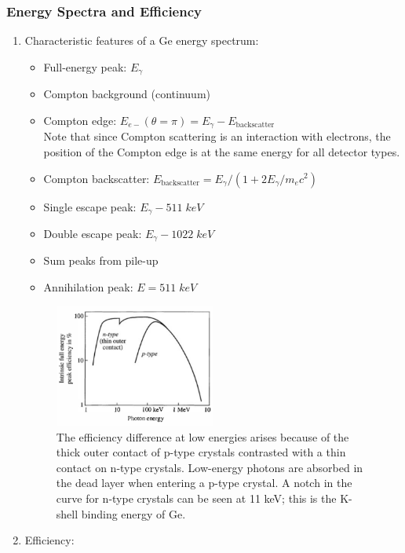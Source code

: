 \subsubsection{Energy Spectra and Efficiency}
\begin{enumerate}
    \item Characteristic features of a Ge energy spectrum:
    \begin{itemize}
        \item Full-energy peak: $E_\gamma$
        \item Compton background (continuum)
        \item Compton edge: $E_{e-}(\theta=\pi)=E_\gamma-E_\text{backscatter}$\\
        Note that since Compton scattering is an interaction with electrons, the position of the Compton edge is at the same energy for all detector types.
        \item Compton backscatter: $E_\text{backscatter}=E_\gamma/(1+2E_\gamma/m_ec^2)$
        \item Single escape peak: $E_\gamma-511\;keV$
        \item Double escape peak: $E_\gamma-1022\;keV$
        \item Sum peaks from pile-up
        \item Annihilation peak: $E=511\;keV$
    \end{itemize}
    \begin{figure}[ht]
        \centering
        \includegraphics[width=0.5\textwidth]{images/intrinsic_pn_efficiency.png}
        \caption{The efficiency difference at low energies arises because of the thick outer contact of p-type crystals contrasted with a thin contact on n-type crystals. Low-energy photons are absorbed in the dead layer when entering a p-type crystal. A notch in the curve for n-type crystals can be seen at 11 keV; this is the K-shell binding energy of Ge.}
        \label{fig:intrinsic_pn_efficiency}
    \end{figure}
    \item Efficiency:

\end{enumerate}
